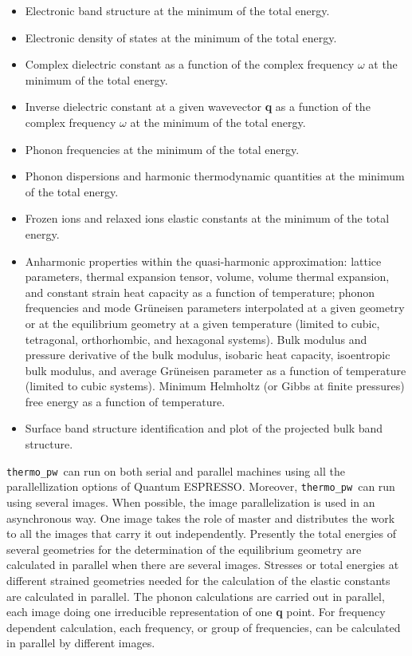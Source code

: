 \documentclass[12pt,a4paper]{article}
\def\qe{{\sc Quantum ESPRESSO}}
\def\thermo{\texttt{thermo\_pw}}
\begin{document}
\begin{itemize}
\item Electronic band structure at the minimum of the total energy.

\item Electronic density of states at the minimum of the total energy.

\item Complex dielectric constant as a function of the complex
frequency $\omega$ at the minimum of the total energy.

\item Inverse dielectric constant at a given wavevector {\bf q} as a function 
of the complex frequency $\omega$ at the minimum of the total energy.

\item Phonon frequencies at the minimum of the total energy.

\item Phonon dispersions and harmonic thermodynamic quantities
at the minimum of the total energy.

\item Frozen ions and relaxed ions elastic constants at the minimum of the total
energy.

\item Anharmonic properties within the quasi-harmonic approximation: 
lattice parameters, thermal expansion tensor, volume, volume thermal 
expansion, and constant strain heat capacity as a function of temperature; 
phonon frequencies and mode Gr\"uneisen parameters interpolated at a given
geometry or at the equilibrium geometry at a given temperature
(limited to cubic, tetragonal, orthorhombic, and hexagonal systems).
Bulk modulus and pressure derivative of the bulk modulus, isobaric heat 
capacity, isoentropic bulk modulus, and average Gr\"uneisen parameter as 
a function of temperature (limited to cubic systems).
Minimum Helmholtz (or Gibbs at finite pressures) free energy 
as a function of temperature.

\item Surface band structure identification and plot of the projected bulk
band structure.

\end{itemize}

\thermo\ can run on both serial and parallel machines using all 
the parallellization options of \qe. Moreover, \thermo\ can run using 
several images.
When possible, the image parallelization is used in an asynchronous way.
One image takes the role of master and distributes the work 
to all the images that carry it out independently. Presently 
the total energies of several geometries for the determination of the 
equilibrium geometry are calculated in parallel when
there are several images. Stresses or total energies at different strained 
geometries needed for the calculation of the elastic constants are 
calculated in parallel. 
The phonon calculations are carried out in parallel, each image doing one 
irreducible representation of one {\bf q} point. For frequency dependent 
calculation,
each frequency, or group of frequencies, can be calculated in parallel
by different images.
\end{document}
